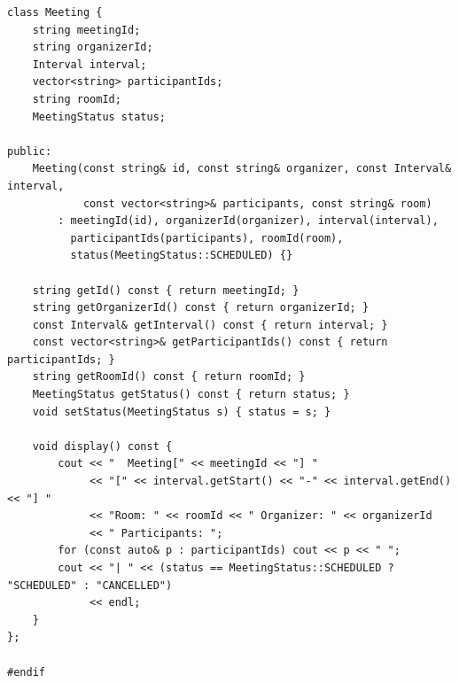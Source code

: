 \documentclass[11pt,a4paper]{article}
\begin{document}
\begin{lstlisting}[title={\texttt{models.hpp}}]
class Meeting {
    string meetingId;
    string organizerId;
    Interval interval;
    vector<string> participantIds;
    string roomId;
    MeetingStatus status;

public:
    Meeting(const string& id, const string& organizer, const Interval& interval,
            const vector<string>& participants, const string& room)
        : meetingId(id), organizerId(organizer), interval(interval),
          participantIds(participants), roomId(room),
          status(MeetingStatus::SCHEDULED) {}

    string getId() const { return meetingId; }
    string getOrganizerId() const { return organizerId; }
    const Interval& getInterval() const { return interval; }
    const vector<string>& getParticipantIds() const { return participantIds; }
    string getRoomId() const { return roomId; }
    MeetingStatus getStatus() const { return status; }
    void setStatus(MeetingStatus s) { status = s; }

    void display() const {
        cout << "  Meeting[" << meetingId << "] "
             << "[" << interval.getStart() << "-" << interval.getEnd() << "] "
             << "Room: " << roomId << " Organizer: " << organizerId
             << " Participants: ";
        for (const auto& p : participantIds) cout << p << " ";
        cout << "| " << (status == MeetingStatus::SCHEDULED ? "SCHEDULED" : "CANCELLED")
             << endl;
    }
};

#endif
\end{lstlisting}

\newpage
\end{document}
